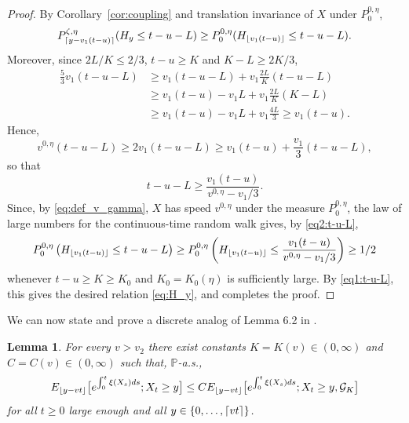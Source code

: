\documentclass[12pt,reqno,oneside]{amsart}
\numberwithin{equation}{section}
\newtheorem{lemma}[theorem]{Lemma}
\theoremstyle{definition}
\theoremstyle{remark}
\newcommand{\PP}{\mathbb{P}}
\DeclarePairedDelimiter{\ceil}{\lceil}{\rceil}
\DeclarePairedDelimiter{\floor}{\lfloor}{\rfloor}
\begin{document}
\begin{proof}
  By Corollary~\ref{cor:coupling} and translation invariance of  $X$ under $P^{0,\eta}_0$,
  \begin{equation}\label{eq1:t-u-L}
    P^{\zeta, \eta}_{\ceil{y- v_1(t-u)}}(H_y \leq t-u-L)
    \geq P^{0,\eta}_0(H_{\floor{ v_1(t-u)}} \leq t-u-L).
  \end{equation}
  Moreover, since $2L/K \leq 2/3$, $t-u \geq K$ and $K-L \geq 2K/3$,
  \begin{align*}
    \frac{5}{3}v_1(t-u-L) &\geq v_1(t-u-L)+ v_1\frac{2L}{K}(t-u-L)\\
    &\geq v_1(t-u) -v_1 L +v_1 \frac{2L}{K}(K-L) \\
    &\geq v_1(t-u) -v_1 L +v_1 \frac{4L}{3} \geq v_1(t-u).
  \end{align*}
  Hence,
  \begin{equation*}
    v^{0,\eta}(t-u-L) \geq 2v_1 (t-u-L) \geq v_1(t-u) + \frac{v_1}{3}(t-u-L),
  \end{equation*}
  so that
  \begin{equation}\label{eq2:t-u-L}
    t-u-L \geq \frac{v_1(t-u)}{v^{0,\eta}-v_1/3}.
  \end{equation}
  Since, by \eqref{eq:def_v_gamma}, $X$ has speed $v^{0,\eta}$ under the measure $P_0^{0,\eta}$, the law
  of large numbers for the continuous-time random walk gives, by
  \eqref{eq2:t-u-L},
  \begin{equation*}
    P^{0,\eta}_0\left(H_{\floor{ v_1(t-u)}} \leq t-u-L \right)
    \geq P^{0,\eta}_0\left(H_{\floor{ v_1(t-u)}} \leq
      \frac{v_1(t-u)}{v^{0,\eta}-v_1/3} \right) \geq 1/2
  \end{equation*}
  whenever $t-u \geq K \geq K_0$ and $K_0=K_0(\eta)$ is sufficiently large. By
  \eqref{eq1:t-u-L}, this gives the desired relation \eqref{eq:H_y}, and completes the proof.
\end{proof}
We can now state and prove a discrete analog of Lemma 6.2 in \cite{CDO25}.
\begin{lemma}\label{lemma:good_event}
    For every $v>v_2$ there exist constants $K=K(v)\in(0,\infty)$ and $C=C(v) \in (0,\infty)$ such that, $\PP$-a.s.,
    \begin{equation*}
        E_{\floor{y-vt}}\big[e^{\int_0^t \xi(X_s)ds}; X_t \geq y\big] \leq CE_{\floor{y-vt}}\big[e^{\int_0^t \xi(X_s)ds}; X_t \geq y, \mathcal{G}_K\big]
    \end{equation*}
    for all $t \geq 0$ large enough and all $y \in \{0, \dots,\ceil{vt}\}$.
\end{lemma}
\end{document}
